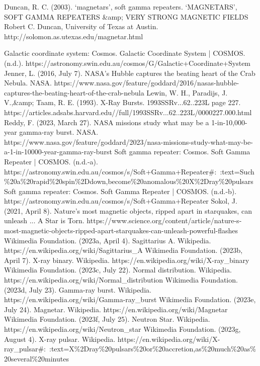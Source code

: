 \documentclass[final,6p,times,twocolumn,authoryear]{elsarticle}
\begin{document}

\begin{thebibliography}{00}
Duncan, R. C. (2003). `magnetars’, soft gamma repeaters. `MAGNETARS’, SOFT GAMMA REPEATERS \&amp; VERY STRONG MAGNETIC FIELDS Robert C. Duncan, University of Texas at Austin. http://solomon.as.utexas.edu/magnetar.html 

Galactic coordinate system: Cosmos. Galactic Coordinate System | COSMOS. (n.d.). https://astronomy.swin.edu.au/cosmos/G/Galactic+Coordinate+System
Jenner, L. (2016, July 7). NASA’s Hubble captures the beating heart of the Crab Nebula. NASA. https://www.nasa.gov/feature/goddard/2016/nasas-hubble-captures-the-beating-heart-of-the-crab-nebula 
Lewin, W. H., Paradijs, J. V.,\&amp; Taam, R. E. (1993). X-Ray Bursts. 1993SSRv...62..223L page 227. https://articles.adsabs.harvard.edu//full/1993SSRv...62..223L/0000227.000.html 
Reddy, F. (2023, March 27). NASA missions study what may be a 1-in-10,000-year gamma-ray burst. NASA. https://www.nasa.gov/feature/goddard/2023/nasa-missions-study-what-may-be-a-1-in-10000-year-gamma-ray-burst 
Soft gamma repeater: Cosmos. Soft Gamma Repeater | COSMOS. (n.d.-a). https://astronomy.swin.edu.au/cosmos/s/Soft+Gamma+Repeater\#:~:text=Such\%20a\%20rapid\%20spin\%2Ddown,become\%20anomalous\%20X\%2Dray\%20pulsars 
Soft gamma repeater: Cosmos. Soft Gamma Repeater | COSMOS. (n.d.-b). https://astronomy.swin.edu.au/cosmos/s/Soft+Gamma+Repeater 
Sokol, J. (2021, April 8). Nature’s most magnetic objects, ripped apart in starquakes, can unleash ... A Star is Torn. https://www.science.org/content/article/nature-s-most-magnetic-objects-ripped-apart-starquakes-can-unleash-powerful-flashes 
Wikimedia Foundation. (2023a, April 4). Sagittarius A. Wikipedia. https://en.wikipedia.org/wiki/Sagittarius\_A 
Wikimedia Foundation. (2023b, April 7). X-ray binary. Wikipedia. https://en.wikipedia.org/wiki/X-ray\_binary 
Wikimedia Foundation. (2023c, July 22). Normal distribution. Wikipedia. https://en.wikipedia.org/wiki/Normal\_distribution 
Wikimedia Foundation. (2023d, July 23). Gamma-ray burst. Wikipedia. https://en.wikipedia.org/wiki/Gamma-ray\_burst 
Wikimedia Foundation. (2023e, July 24). Magnetar. Wikipedia. https://en.wikipedia.org/wiki/Magnetar 
Wikimedia Foundation. (2023f, July 25). Neutron Star. Wikipedia. https://en.wikipedia.org/wiki/Neutron\_star 
Wikimedia Foundation. (2023g, August 4). X-ray pulsar. Wikipedia. https://en.wikipedia.org/wiki/X-ray\_pulsar\#:~:text=X\%2Dray\%20pulsars\%20or\%20accretion,as\%20much\%20as\%20several\%20minutes 

\end{thebibliography}
\end{document}
